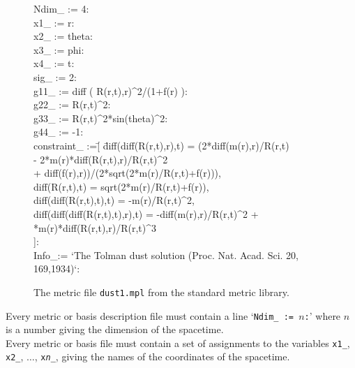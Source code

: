 \documentclass{article}
\begin{document}
\begin{figure}
  \begin{ttfamily}
    \begin{tabbing}
      Ndim\_ := 4:\\

      x1\_ := r:\\
      x2\_ := theta:\\
      x3\_ := phi:\\
      x4\_ := t:\\
      sig\_ := 2:\\
      g11\_ := diff ( R(r,t),r)\^{}2/(1+f(r) ):\\
      g22\_ := R(r,t)\^{}2:\\
      g33\_ := R(r,t)\^{}2*sin(theta)\^{}2:\\
      g44\_ := -1:\\

      constraint\_ :=\= [ \= diff(diff(R(r,t),r),t) = 
        (2*diff(m(r),r)/R(r,t) \\
        \> \> - 2*m(r)*diff(R(r,t),r)/R(r,t)\^{}2 \\
        \> \> + diff(f(r),r))/(2*sqrt(2*m(r)/R(r,t)+f(r))),\\ 
        \> \> diff(R(r,t),t) = sqrt(2*m(r)/R(r,t)+f(r)),\\
        \> \> diff(diff(R(r,t),t),t) = -m(r)/R(r,t)\^{}2,\\
        \> \> diff(diff(diff(R(r,t),t),r),t) = 
          -diff(m(r),r)/R(r,t)\^{}2 + \\
        \> *m(r)*diff(R(r,t),r)/R(r,t)\^{}3\\
        \> ]:\\

      Info\_:=
        `The Tolman dust solution (Proc. Nat. Acad. Sci. 20, 169,1934)`:
    \end{tabbing}
  \end{ttfamily}
  \caption{The metric file \texttt{dust1.mpl} from the standard metric
    library.}
  \label{fig:metricfile}
\end{figure}
Every metric or basis description file must contain a line 
`\texttt{Ndim\_ := $n$:}'
where \texttt{$n$} is a number giving the dimension of the spacetime.\\

Every metric or basis file must contain a set of assignments to the
variables \texttt{x1\_}, \texttt{x2\_}, $\ldots$,
\texttt{x\textsl{n}\_}, giving the names of the coordinates of the
spacetime.\\
\end{document}
